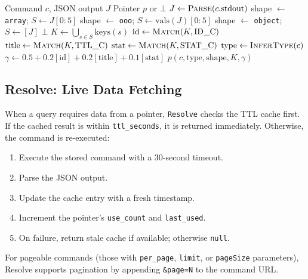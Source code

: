 \documentclass[11pt,twocolumn]{article}
\begin{document}
\begin{algorithm}[t]
\caption{Schema Inference}
\label{alg:schema}
\begin{algorithmic}[1]
\REQUIRE Command $c$, JSON output $J$
\ENSURE Pointer $p$ or $\bot$
\STATE $J \leftarrow \text{\textsc{Parse}}(c.\text{stdout})$
  \STATE shape $\leftarrow$ \texttt{array}; $S \leftarrow J[0{:}5]$
  \STATE shape $\leftarrow$ \texttt{ooo}; $S \leftarrow \text{vals}(J)[0{:}5]$
  \STATE shape $\leftarrow$ \texttt{object}; $S \leftarrow [J]$
\ELSE
  \RETURN $\bot$
\ENDIF
\STATE $K \leftarrow \bigcup_{s \in S} \text{keys}(s)$
\STATE $\text{id} \leftarrow \text{\textsc{Match}}(K, \text{ID\_C})$
\STATE $\text{title} \leftarrow \text{\textsc{Match}}(K, \text{TTL\_C})$
\STATE $\text{stat} \leftarrow \text{\textsc{Match}}(K, \text{STAT\_C})$
\STATE $\text{type} \leftarrow \text{\textsc{InferType}}(c)$
\STATE $\gamma \leftarrow 0.5 {+} 0.2[\text{id}] {+} 0.2[\text{title}] {+} 0.1[\text{stat}]$
\RETURN $p(c, \text{type}, \text{shape}, K, \gamma)$
\end{algorithmic}
\end{algorithm}


\subsection{Resolve: Live Data Fetching}
\label{sec:resolve}

When a query requires data from a pointer, \texttt{Resolve} checks the TTL cache first.
If the cached result is within \texttt{ttl\_seconds}, it is returned immediately.
Otherwise, the command is re-executed:

\begin{enumerate}[leftmargin=1.5em,itemsep=2pt]
  \item Execute the stored command with a 30-second timeout.
  \item Parse the JSON output.
  \item Update the cache entry with a fresh timestamp.
  \item Increment the pointer's \texttt{use\_count} and \texttt{last\_used}.
  \item On failure, return stale cache if available; otherwise \texttt{null}.
\end{enumerate}

For pageable commands (those with \texttt{per\_page}, \texttt{limit}, or \texttt{pageSize} parameters), Resolve supports pagination by appending \texttt{\&page=N} to the command URL.
\end{document}
